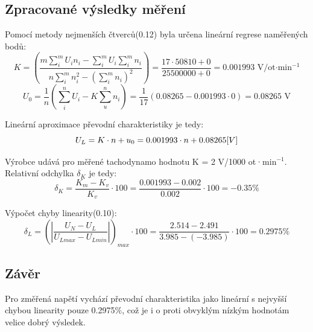 \documentclass{protokol}
\begin{document}
    \subsection{Zpracované výsledky měření}
        Pomocí metody nejmenších čtverců\cite{vypocty}(0.12) byla určena lineární regrese naměřených bodů:
        \begin{equation}
            K = \left( \dfrac{m \sum_{i}^{m} U_i n_i - \sum_{i}^{m} U_i \sum_{i}^{m} n_i }{n \sum_{i}^{m} n_i^2 - \left(\sum_{i}^{m} n_i \right)^2} \right) = \dfrac{17 \cdot 50810 + 0}{25500000 + 0} = 0.001993 \text{ V/ot·min$^{-1}$}
        \end{equation}
        \begin{equation}
            U_0 = \dfrac{1}{n} \left( \sum_{i}^{n} U_i - K \sum_{u}^{n} n_i\right) = \dfrac{1}{17} \left( 0.08265 - 0.001993 \cdot 0 \right) = 0.08265 \text{ V}
        \end{equation}

        Lineární aproximace převodní charakteristiky je tedy:
        \begin{equation}
            U_L = K\cdot n + u_0 = 0.001993 \cdot n + 0.08265 \text[ V]
        \end{equation}

        Výrobce udává pro měřené tachodynamo hodnotu K = 2 V/1000 ot·min$^{-1}$\cite{navod}. Relativní odchylka $\delta_K$ je tedy:
        \begin{equation}
            \delta_K = \dfrac{K_{m} - K_v}{K_v} \cdot 100 = \dfrac{0.001993 - 0.002}{0.002} \cdot 100  = -0.35\%
        \end{equation}

        Výpočet chyby linearity\cite{vypocty}(0.10):
        \begin{equation}
            \delta_L = \left( \left| \dfrac{U_N - U_L}{U_{Lmax} - U_{Lmin}} \right| \right)_{max} \cdot 100  = \dfrac{2.514 - 2.491}{3.985 - (-3.985)} \cdot 100 = 0.2975\%
        \end{equation}
        \linebreak
    \subsection{Závěr}
        Pro změřená napětí vychází převodní charakteristika jako lineární s nejvyšší chybou linearity pouze 0.2975$\%$, což je i o proti obvyklým nízkým hodnotám velice dobrý výsledek.
        
\end{document}
